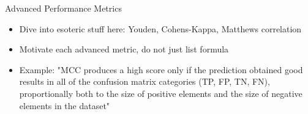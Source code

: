 \documentclass[11pt,compress,t,notes=noshow, aspectratio=169, xcolor=table]{beamer}
\begin{document}


\begin{frame}{Advanced Performance Metrics}

\begin{itemize}
    \item Dive into esoteric stuff here: Youden, Cohens-Kappa, Matthews correlation
    \item Motivate each advanced metric, do not just list formula
    \item Example: "MCC produces a high score only if the prediction obtained good results in all of the confusion matrix categories (TP, FP, TN, FN), proportionally both to the size of positive elements and the size of negative elements in the dataset"
\end{itemize}
\end{frame}



\endlecture
\end{document}
